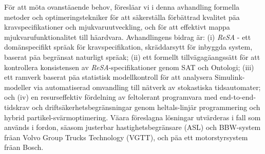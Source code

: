{F{\"o}r att m{\"o}ta ovanst{\"aa}ende behov, f{\"o}resl{\"aa}r vi i denna avhandling formella metoder och optimeringstekniker f{\"o}r att s{\"a}kerst{\"a}lla f{\"o}rb{\"a}ttrad kvalitet p{\"aa} kravspecifikationer och mjukvaruutveckling, och f{\"o}r att effektivt mappa mjukvarufunktionalitet till h{\"aa}rdvara. Avhandlingens bidrag {\"a}r: (i) \textit{ReSA} - ett dom{\"a}nspecifikt spr{\"aa}k f{\"o}r kravspecifikation, skr{\"a}ddarsytt f{\"o}r inbyggda system, baserat p{\"aa} begr{\"a}nsat naturligt spr{\"aa}k; (ii) ett formellt tillv{\"a}gag{\"aa}ngss{\"a}tt f{\"o}r att kontrollera konsistensen av \textit{ReSA}-specifikationer genom SAT och Ontologi; (iii) ett ramverk baserat p{\"aa} statistisk modellkontroll f{\"o}r att analysera Simulink-modeller via automatiserad omvandling till n{\"a}tverk av stokastiska tidsautomater; och (iv) en resurseffektiv f{\"o}rdelning av feltolerant programvara med end-to-end-tidskrav och drifts{\"a}kerhetsbegr{\"a}nsningar genom heltals-linj{\"a}r programmering och hybrid partikel-sv{\"a}rmoptimering. V{\"aa}ra f{\"o}reslagna l{\"o}sningar utv{\"a}rderas i fall som anv{\"a}nds i fordon, s{\"aa}som justerbar hastighetsbegr{\"a}nsare (ASL) och BBW-system fr{\"aa}n Volvo Group Trucks Technology (VGTT), och p{\"aa} ett motorstyrsystem fr{\"aa}n Bosch.


} %

\newcommand{\halftitlepage}{%
\thispagestyle{empty}
\begin{center}
	ACTA UNIVERSITATIS UPSALIENSIS

	\emph{\series{}}
	
	\serialNumber
\end{center}
\cleardoublepage}

